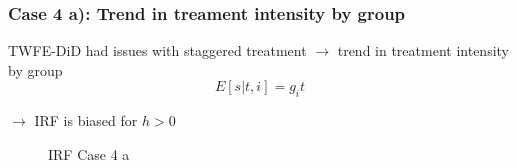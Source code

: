 \documentclass[notes,11pt, aspectratio = 169]{beamer}
\begin{document}
\begin{frame}\frametitle{Case 4 a): Trend in treament intensity by group }
    \begin{wideitemize}
        \item TWFE-DiD had issues with staggered treatment  $\rightarrow$ trend in treatment intensity by group  
            \[E[s|t,i] = g_i t\] 
        \item[$\rightarrow$] IRF is biased for $h>0$ 
    \end{wideitemize}

    \begin{figure}
        \centering
      \caption{IRF Case 4 a}
      \end{figure}
\end{frame}
\end{document}
